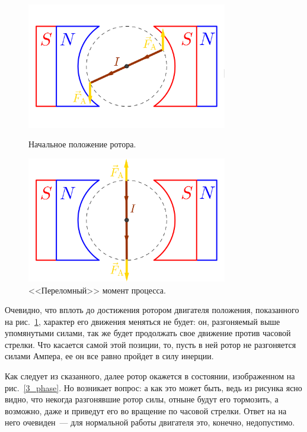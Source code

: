 \documentclass[12pt, a4paper, openany]{extarticle}
\begin{document}
\begin{figure}[h]
	\begin{center}
		\begin{minipage}[h]{0.49\linewidth}
			\centering\includegraphics[height=5.5cm]{phase_1.png}
			\caption{Начальное положение ротора.}
			\label{1_phase} 
		\end{minipage}
		\hfill 
		\begin{minipage}[h]{0.49\linewidth}
			\centering\includegraphics[height=5.5cm]{phase_2.png}
			\caption{<<Переломный>> момент процесса.}
			\label{2_phase}
		\end{minipage}
	\end{center}
\end{figure}

Очевидно, что вплоть до достижения ротором двигателя положения, показанного на рис.~\ref{2_phase}, характер его движения меняться не будет: он, разгоняемый выше упомянутыми силами, так же будет продолжать свое движение против часовой стрелки. 
Что касается самой этой позиции, то, пусть в ней ротор не разгоняется силами Ампера, ее он все равно пройдет в силу инерции. 

Как следует из сказанного, далее ротор окажется в состоянии, изображенном на рис.~\ref{3_phase}. 
Но возникает вопрос: а как это может быть, ведь из рисунка ясно видно, что некогда разгонявшие ротор силы, отныне будут его тормозить, а возможно, даже и приведут его во вращение по часовой стрелки. 
Ответ на на него очевиден~--- для нормальной работы двигателя это, конечно, недопустимо.
\end{document}
